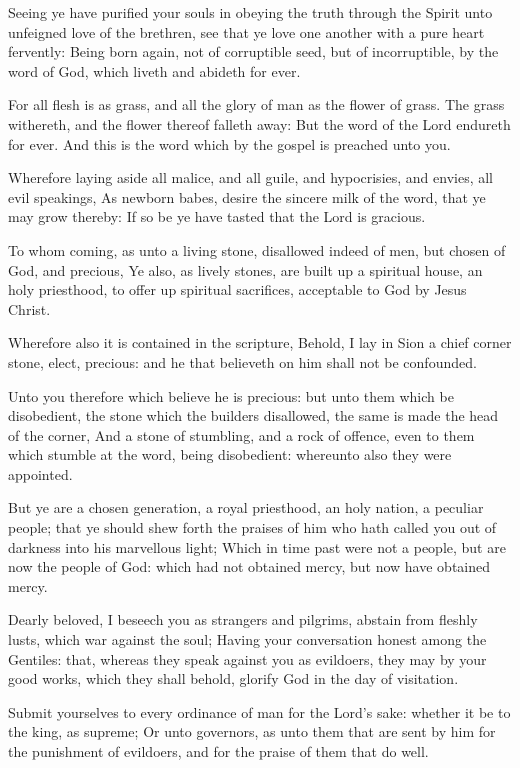 \Verse Seeing ye have purified your souls in obeying the truth through the Spirit unto unfeigned love of the brethren, see that ye love one another with a pure heart fervently: \Verse Being born again, not of corruptible seed, but of incorruptible, by the word of God, which liveth and abideth for ever.

\Verse For all flesh is as grass, and all the glory of man as the flower of grass. The grass withereth, and the flower thereof falleth away: \Verse But the word of the Lord endureth for ever. And this is the word which by the gospel is preached unto you.


\Chapter
\Verse Wherefore laying aside all malice, and all guile, and hypocrisies, and envies, all evil speakings, \Verse As newborn babes, desire the sincere milk of the word, that ye may grow thereby: \Verse If so be ye have tasted that the Lord is gracious.

\Verse To whom coming, as unto a living stone, disallowed indeed of men, but chosen of God, and precious, \Verse Ye also, as lively stones, are built up a spiritual house, an holy priesthood, to offer up spiritual sacrifices, acceptable to God by Jesus Christ.

\Verse Wherefore also it is contained in the scripture, Behold, I lay in Sion a chief corner stone, elect, precious: and he that believeth on him shall not be confounded.

\Verse Unto you therefore which believe he is precious: but unto them which be disobedient, the stone which the builders disallowed, the same is made the head of the corner, \Verse And a stone of stumbling, and a rock of offence, even to them which stumble at the word, being disobedient: whereunto also they were appointed.

\Verse But ye are a chosen generation, a royal priesthood, an holy nation, a peculiar people; that ye should shew forth the praises of him who hath called you out of darkness into his marvellous light; \Verse Which in time past were not a people, but are now the people of God: which had not obtained mercy, but now have obtained mercy.

\Verse Dearly beloved, I beseech you as strangers and pilgrims, abstain from fleshly lusts, which war against the soul; \Verse Having your conversation honest among the Gentiles: that, whereas they speak against you as evildoers, they may by your good works, which they shall behold, glorify God in the day of visitation.

\Verse Submit yourselves to every ordinance of man for the Lord's sake: whether it be to the king, as supreme; \Verse Or unto governors, as unto them that are sent by him for the punishment of evildoers, and for the praise of them that do well.

